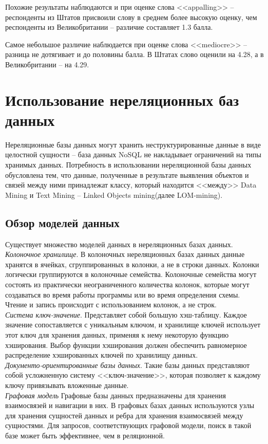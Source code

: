Похожие результаты наблюдаются и при оценке слова <<appalling>> -- респонденты из Штатов присвоили слову в среднем более высокую оценку, чем респонденты из Великобритании -- различие составляет 1.3 балла.
 
Самое небольшое различие наблюдается при оценке слова <<mediocre>> -- разница не дотягивает и до половины балла. В Штатах слово оценили на 4.28, а в Великобритании -- на 4.29.
\section{Использование нереляционных баз данных}
Нереляционные базы данных могут хранить неструктурированные данные в виде целостной сущности -- база данных NoSQL не накладывает ограничений на типы хранимых данных. Потребность в использовании нереляционной базы данных обусловлена тем, что данные, полученные в результате выявления объектов и связей между ними принадлежат классу, который находится <<между>> Data Mining и Text Mining -- Linked Objects mining(далее LOM-mining). \cite{Попов2004}
\subsection{Обзор моделей данных}\label{subsec:store}
Существует множество моделей данных в нереляционных базах данных. \\
\textit{Колоночное хранилище}. В колоночных нереляционных базах данных данные хранятся в ячейках, сгруппированных в колонки, а не в строки данных. Колонки логически группируются в колоночные семейства. Колоночные семейства могут состоять из практически неограниченного количества колонок, которые могут создаваться во время работы программы или во время определения схемы. Чтение и запись происходит с использованием колонок, а не строк. \\
\textit{Система ключ-значение}. Представляет собой большую хэш-таблицу. Каждое значение сопоставляется с уникальным ключом, и хранилище ключей использует этот ключ для хранения данных, применяя к нему некоторую функцию хэширования. Выбор функции хэширования должен обеспечить равномерное распределение хэшированных ключей по хранилищу данных. \cite{nosql} \\
\textit{Документо-ориентированные базы данных}. Такие базы данных представляют собой усложненную систему <<ключ-значение>>, которая позволяет к каждому ключу привязывать вложенные данные. \\
\textit{Графовая модель} Графовые базы данных предназначены для хранения взаимосвязей и навигации в них. В графовых базах данных используются узлы для хранения сущностей данных и ребра для хранения взаимосвязей между сущностями. Для запросов, соответствующих графовой модели, поиск в такой базе может быть эффективнее, чем в реляционной. 

